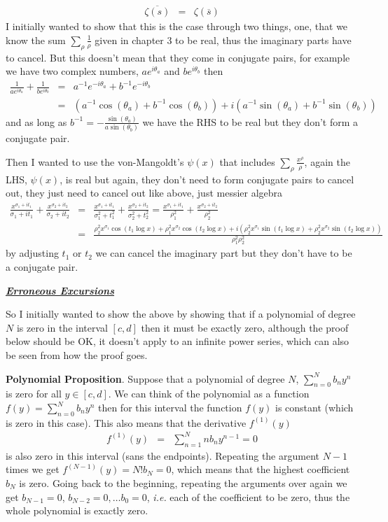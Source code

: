 \documentclass[aps,preprint,preprintnumbers,nofootinbib,showpacs,prd]{revtex4-1}
\newcommand{\ie}{{\it i.e.} }
\newcommand{\nbea}{\begin{eqnarray*}}
\newcommand{\neea}{\end{eqnarray*}}
\begin{document}
%
\nbea
\overline{\zeta(s)} & = & \zeta(\overline{s})
\neea
%
I initially wanted to show that this is the case through two things, one, that we know the sum $\sum_{\rho} \frac{1}{\rho}$ given in chapter 3 to be real, thus the imaginary parts have to cancel. But this doesn't mean that they come in conjugate pairs, for example  we have two complex numbers, $ae^{i\theta_a}$ and $be^{i\theta_b}$ then
%
\nbea
\frac{1}{a e^{i\theta_a}} + \frac{1}{b e^{i\theta_b}} & = & a^{-1} e^{-i\theta_a} + b^{-1} e^{-i\theta_b} \\
& = & (a^{-1} \cos(\theta_a) + b^{-1} \cos(\theta_b)) + i(a^{-1}\sin(\theta_a) + b^{-1}\sin(\theta_b))
\neea
%
and as long as $b^{-1} = -\frac{\sin(\theta_a)}{a \sin(\theta_b)}$ we have the RHS to be real but they don't form a conjugate pair.

Then I wanted to use the von-Mangoldt's $\psi(x)$ that includes $\sum_\rho \frac{x^\rho}{\rho}$, again the LHS, $\psi(x)$, is real but again, they don't need to form conjugate pairs to cancel out, they just need to cancel out like above, just messier algebra
%
\nbea
\frac{x^{\sigma_1 + it_1}}{\sigma_1 + it_1} + \frac{x^{\sigma_2 + it_2}}{\sigma_2 + it_2} & = & \frac{x^{\sigma_1 + it_1}}{\sigma_1^2 + t_1^2} + \frac{x^{\sigma_2 + it_2}}{\sigma_2^2 + t_2^2} = \frac{x^{\sigma_1 + it_1}}{\rho_1^2} + \frac{x^{\sigma_2 + it_2}}{\rho_2^2} \\
& = & \frac{\rho_2^2 x^{\sigma_1} \cos(t_1 \log x) + \rho_1^2 x^{\sigma_2} \cos(t_2 \log x) + i (\rho_2^2 x^{\sigma_1} \sin(t_1 \log x) + \rho_2^2 x^{\sigma_2} \sin(t_2 \log x))}{\rho_1^2\rho_2^2}
\neea
%
by adjusting $t_1$ or $t_2$ we can cancel the imaginary part but they don't have to be a conjugate pair.

\bigskip
\underline{\textbf{\textit{Erroneous Excursions}}}

So I initially wanted to show the above by showing that if a polynomial of degree $N$ is zero in the interval $[c,d]$ then it must be exactly zero, although the proof below should be OK, it doesn't apply to an infinite power series, which can also be seen from how the proof goes.

{\bf Polynomial Proposition}. Suppose that a polynomial of degree $N$, $\sum_{n=0}^N b_n y^n$ is zero for all $y \in [c,d]$. We can think of the polynomial as a function $f(y) = \sum_{n=0}^N b_n y^n$ then for this interval the function $f(y)$ is constant (which is zero in this case). This also means that the derivative $f^{(1)}(y)$ 
%
\nbea
f^{(1)}(y) & = & \sum_{n=1}^N n b_n y^{n-1} = 0
\neea
%
is also zero in this interval (sans the endpoints). Repeating the argument $N-1$ times we get $f^{(N-1)}(y) = N! b_N = 0$, which means that the highest coefficient $b_N$ is zero. Going back to the beginning, repeating the arguments over again we get $b_{N-1} = 0$, $b_{N-2} = 0, \dots b_0 = 0$, \ie each of the coefficient to be zero, thus the whole polynomial is exactly zero.
\end{document}
